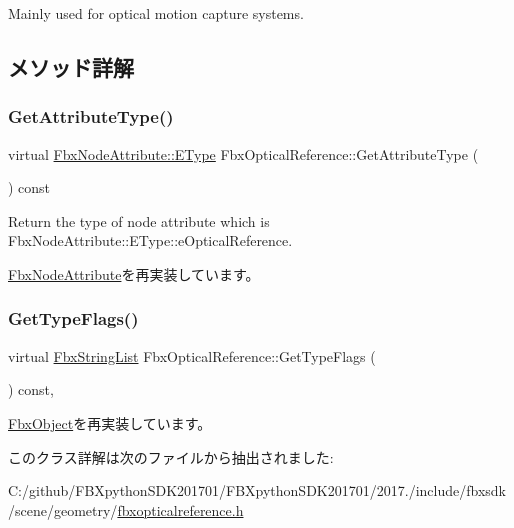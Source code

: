 Mainly used for optical motion capture systems. 

\subsection{メソッド詳解}
\mbox{\label{class_fbx_optical_reference_ac2c1840cbfffb236bd3b9fe49d797e12}} 
\subsubsection{\texorpdfstring{Get\+Attribute\+Type()}{GetAttributeType()}}
{\footnotesize\ttfamily virtual \hyperlink{class_fbx_node_attribute_a08e1669d3d1a696910756ab17de56d6a}{Fbx\+Node\+Attribute\+::\+E\+Type} Fbx\+Optical\+Reference\+::\+Get\+Attribute\+Type (\begin{DoxyParamCaption}{ }\end{DoxyParamCaption}) const\hspace{0.3cm}{\ttfamily [virtual]}}



Return the type of node attribute which is Fbx\+Node\+Attribute\+::\+E\+Type\+::e\+Optical\+Reference. 



\hyperlink{class_fbx_node_attribute_a1c2116756906127145a2b8721fc26752}{Fbx\+Node\+Attribute}を再実装しています。

\mbox{\label{class_fbx_optical_reference_ad45da7e49810bea40ff29fdaf0ca9b0b}} 
\subsubsection{\texorpdfstring{Get\+Type\+Flags()}{GetTypeFlags()}}
{\footnotesize\ttfamily virtual \hyperlink{class_fbx_string_list}{Fbx\+String\+List} Fbx\+Optical\+Reference\+::\+Get\+Type\+Flags (\begin{DoxyParamCaption}{ }\end{DoxyParamCaption}) const\hspace{0.3cm}{\ttfamily [protected]}, {\ttfamily [virtual]}}



\hyperlink{class_fbx_object_a6d30a5d00400039a248977cf9f9255b2}{Fbx\+Object}を再実装しています。



このクラス詳解は次のファイルから抽出されました\+:\begin{DoxyCompactItemize}
\item 
C\+:/github/\+F\+B\+Xpython\+S\+D\+K201701/\+F\+B\+Xpython\+S\+D\+K201701/2017./include/fbxsdk/scene/geometry/\hyperlink{fbxopticalreference_8h}{fbxopticalreference.\+h}\end{DoxyCompactItemize}
